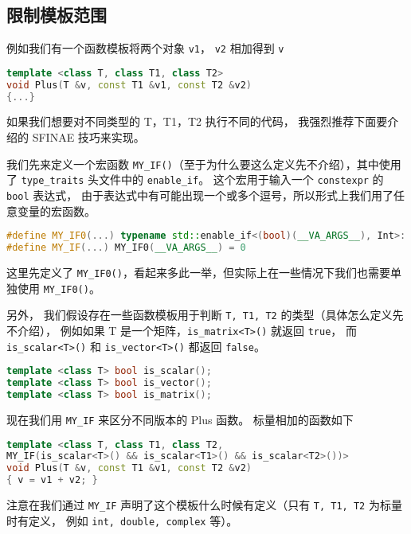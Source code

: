 
\begin{issues}
\issueMissDepend
\end{issues}

\subsection{限制模板范围}
例如我们有一个函数模板将两个对象 \verb|v1|， \verb|v2| 相加得到 \verb|v|
\begin{lstlisting}[language=cpp]
template <class T, class T1, class T2>
void Plus(T &v, const T1 &v1, const T2 &v2)
{...}
\end{lstlisting}
如果我们想要对不同类型的 T，T1，T2 执行不同的代码， 我强烈推荐下面要介绍的 SFINAE 技巧来实现。

我们先来定义一个宏函数 \verb|MY_IF()|（至于为什么要这么定义先不介绍），其中使用了 \verb|type_traits| 头文件中的 \verb|enable_if|。 这个宏用于输入一个 \verb|constexpr| 的 \verb|bool| 表达式， 由于表达式中有可能出现一个或多个逗号，所以形式上我们用了任意变量的宏函数。
\begin{lstlisting}[language=cpp]
#define MY_IF0(...) typename std::enable_if<(bool)(__VA_ARGS__), Int>::type
#define MY_IF(...) MY_IF0(__VA_ARGS__) = 0
\end{lstlisting}
这里先定义了 \verb|MY_IF0()|，看起来多此一举，但实际上在一些情况下我们也需要单独使用 \verb|MY_IF0()|。

另外， 我们假设存在一些函数模板用于判断 \verb|T, T1, T2| 的类型（具体怎么定义先不介绍）， 例如如果 T 是一个矩阵，\verb|is_matrix<T>()| 就返回 \verb|true|， 而 \verb|is_scalar<T>()| 和 \verb|is_vector<T>()| 都返回 \verb|false|。
\begin{lstlisting}[language=cpp]
template <class T> bool is_scalar();
template <class T> bool is_vector();
template <class T> bool is_matrix();
\end{lstlisting}

现在我们用 \verb|MY_IF| 来区分不同版本的 Plus 函数。 标量相加的函数如下
\begin{lstlisting}[language=cpp]
template <class T, class T1, class T2,
MY_IF(is_scalar<T>() && is_scalar<T1>() && is_scalar<T2>())>
void Plus(T &v, const T1 &v1, const T2 &v2)
{ v = v1 + v2; }
\end{lstlisting}

注意在我们通过 \verb|MY_IF| 声明了这个模板什么时候有定义（只有 \verb|T, T1, T2| 为标量时有定义， 例如 \verb|int, double, complex| 等）。


